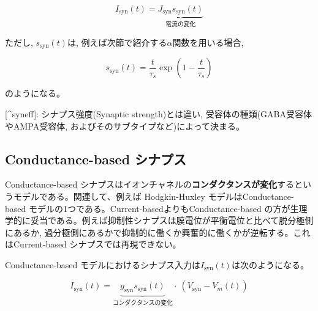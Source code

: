 \begin{equation}

I_{\text{syn}}(t)=\underbrace{J_{\text{syn}}s_{\text{syn}}(t)}_{電流の変化}    

\end{equation}





ただし, $s_{\text{syn}}(t)$は, 例えば次節で紹介する$\alpha$関数を用いる場合, 





\begin{equation}

s_{\text{syn}}(t)=\dfrac{t}{\tau_s} \exp \left(1-\dfrac{t}{\tau_s}\right)    

\end{equation}





のようになる。



[^syneff]: シナプス強度(Synaptic strength)とは違い, 受容体の種類(GABA受容体やAMPA受容体,  およびそのサブタイプなど)によって決まる。



\subsection{Conductance-based シナプス
}
Conductance-based シナプスはイオンチャネルの\textbf{コンダクタンスが変化}するというモデルである。関連して、例えば Hodgkin-Huxley モデルはConductance-based モデルの1つである。Current-basedよりもConductance-based の方が生理学的に妥当である。例えば抑制性シナプスは膜電位が平衡電位と比べて脱分極側にあるか, 過分極側にあるかで抑制的に働くか興奮的に働くかが逆転する。これはCurrent-based シナプスでは再現できない。



Conductance-based モデルにおけるシナプス入力は$I_{\text{syn}}(t)$は次のようになる。 





\begin{equation}

I_{\text{syn}}(t)=\underbrace{g_{\text{syn}}s_{\text{syn}}(t)}_{コンダクタンスの変化}\cdot\ \left(V_{\text{syn}}-V_{m}(t)\right)    

\end{equation}





